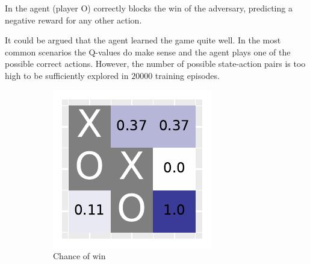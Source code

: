 \documentclass[10pt]{IEEEtran}
\begin{document}
In  the agent (player O) correctly blocks the win of the adversary, predicting a negative reward for any other action.

It could be argued that the agent learned the game quite well. In the most common scenarios the Q-values do make sense and the agent plays one of the possible correct actions. However, the number of possible state-action pairs is too high to be sufficiently explored in $20000$ training episodes. 

\begin{figure}[H]
     \centering
     \begin{subfigure}[b]{0.32\linewidth}
         \centering
         \includegraphics[width=\linewidth]{code/figures/heatmap_0.pdf}
         \caption{Chance of win}
         \label{fig_heatmap_1}
     \end{subfigure}
     \hfill
     \begin{subfigure}[b]{0.32\linewidth}
         \centering

\end{subfigure}
\end{figure}
\end{document}
